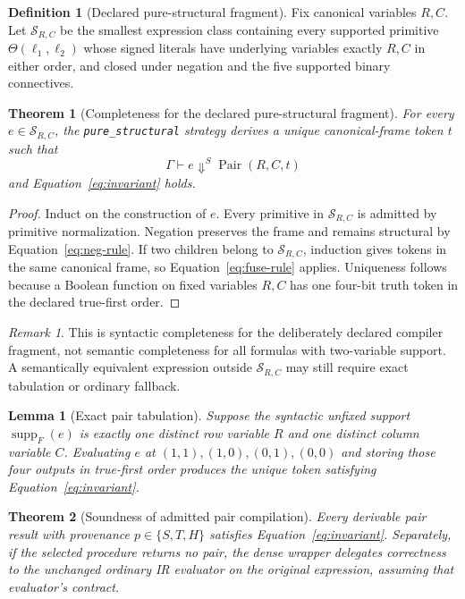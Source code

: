 \documentclass[10pt]{article}
\newcommand{\Pair}{\operatorname{Pair}}
\newcommand{\supp}{\operatorname{supp}}
\theoremstyle{plain}
\newtheorem{theorem}{Theorem}
\newtheorem{lemma}{Lemma}
\theoremstyle{definition}
\newtheorem{definition}{Definition}
\theoremstyle{remark}
\newtheorem{remark}{Remark}
\begin{document}
\begin{definition}[Declared pure-structural fragment]
Fix canonical variables $R,C$. Let $\mathcal S_{R,C}$ be the smallest expression class containing every supported primitive $\Theta(\ell_1,\ell_2)$ whose signed literals have underlying variables exactly $R,C$ in either order, and closed under negation and the five supported binary connectives.
\end{definition}

\begin{theorem}[Completeness for the declared pure-structural fragment]
For every $e\in\mathcal S_{R,C}$, the \texttt{pure\_structural} strategy derives a unique canonical-frame token $t$ such that
\[
 \Gamma\vdash e\Downarrow^S\Pair(R,C,t)
\]
and Equation~\eqref{eq:invariant} holds.
\end{theorem}

\begin{proof}
Induct on the construction of $e$. Every primitive in $\mathcal S_{R,C}$ is admitted by primitive normalization. Negation preserves the frame and remains structural by Equation~\eqref{eq:neg-rule}. If two children belong to $\mathcal S_{R,C}$, induction gives tokens in the same canonical frame, so Equation~\eqref{eq:fuse-rule} applies. Uniqueness follows because a Boolean function on fixed variables $R,C$ has one four-bit truth token in the declared true-first order.
\end{proof}

\begin{remark}
This is syntactic completeness for the deliberately declared compiler fragment, not semantic completeness for all formulas with two-variable support. A semantically equivalent expression outside $\mathcal S_{R,C}$ may still require exact tabulation or ordinary fallback.
\end{remark}

\begin{lemma}[Exact pair tabulation]
Suppose the syntactic unfixed support $\supp_F(e)$ is exactly one distinct row variable $R$ and one distinct column variable $C$. Evaluating $e$ at $(1,1),(1,0),(0,1),(0,0)$ and storing those four outputs in true-first order produces the unique token satisfying Equation~\eqref{eq:invariant}.
\end{lemma}

\begin{theorem}[Soundness of admitted pair compilation]
Every derivable pair result with provenance $p\in\{S,T,H\}$ satisfies Equation~\eqref{eq:invariant}. Separately, if the selected procedure returns no pair, the dense wrapper delegates correctness to the unchanged ordinary IR evaluator on the original expression, assuming that evaluator's contract.
\end{theorem}
\end{document}
